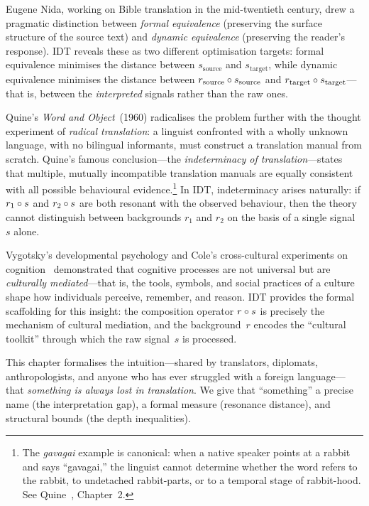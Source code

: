 Eugene Nida, working on Bible translation in the mid-twentieth century,
drew a pragmatic distinction between \emph{formal equivalence} (preserving
the surface structure of the source text) and \emph{dynamic equivalence}
(preserving the reader's response).  IDT reveals these as two different
optimisation targets: formal equivalence minimises the distance between
$s_{\mathrm{source}}$ and $s_{\mathrm{target}}$, while dynamic
equivalence minimises the distance between
$r_{\mathrm{source}} \circ s_{\mathrm{source}}$ and
$r_{\mathrm{target}} \circ s_{\mathrm{target}}$---that is, between
the \emph{interpreted} signals rather than the raw ones.

Quine's \textit{Word and Object}~(1960) radicalises the problem further
with the thought experiment of \emph{radical translation}: a linguist
confronted with a wholly unknown language, with no bilingual informants,
must construct a translation manual from scratch.  Quine's famous
conclusion---the \emph{indeterminacy of translation}---states that
multiple, mutually incompatible translation manuals are equally
consistent with all possible behavioural evidence.\footnote{The
\emph{gavagai} example is canonical: when a native speaker points at a
rabbit and says ``gavagai,'' the linguist cannot determine whether the
word refers to the rabbit, to undetached rabbit-parts, or to a temporal
stage of rabbit-hood.  See Quine~\cite{quine1960}, Chapter~2.}  In IDT,
indeterminacy arises naturally: if $r_1 \circ s$ and $r_2 \circ s$
are both resonant with the observed behaviour, then the theory cannot
distinguish between backgrounds $r_1$ and $r_2$ on the basis of a
single signal~$s$ alone.

Vygotsky's developmental psychology and Cole's cross-cultural
experiments on cognition~\cite{cole1996} demonstrated that cognitive
processes are not universal but are \emph{culturally mediated}---that is,
the tools, symbols, and social practices of a culture shape how
individuals perceive, remember, and reason.  IDT provides the formal
scaffolding for this insight: the composition operator $r \circ s$ is
precisely the mechanism of cultural mediation, and the background~$r$
encodes the ``cultural toolkit'' through which the raw signal~$s$ is
processed.

This chapter formalises the intuition---shared by translators, diplomats,
anthropologists, and anyone who has ever struggled with a foreign
language---that \emph{something is always lost in translation}.  We give
that ``something'' a precise name (the interpretation gap), a formal
measure (resonance distance), and structural bounds (the depth
inequalities).

